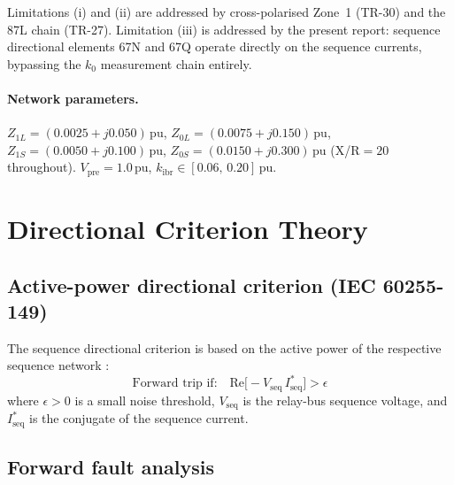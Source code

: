 \documentclass[11pt,a4paper]{article}
\begin{document}
Limitations (i) and (ii) are addressed by cross-polarised Zone~1 (TR-30) and the
87L chain (TR-27).  Limitation (iii) is addressed by the present report: sequence
directional elements 67N and 67Q operate directly on the sequence currents,
bypassing the $k_0$ measurement chain entirely.

\paragraph{Network parameters.}
$Z_{1L}=(0.0025+j0.050)$\,pu, $Z_{0L}=(0.0075+j0.150)$\,pu,
$Z_{1S}=(0.0050+j0.100)$\,pu, $Z_{0S}=(0.0150+j0.300)$\,pu (X/R$=20$
throughout).  $V_\mathrm{pre}=1.0$\,pu, $k_\mathrm{ibr} \in [0.06,\,0.20]$\,pu.

\section{Directional Criterion Theory}
\label{sec:theory}

\subsection{Active-power directional criterion (IEC 60255-149)}

The sequence directional criterion is based on the active power of the respective
sequence network \cite{IEC_60255_149}:
\begin{equation}
  \boxed{
    \text{Forward trip if:}\quad
    \mathrm{Re}\bigl[-V_\mathrm{seq}\,I_\mathrm{seq}^*\bigr] > \epsilon
  }
  \label{eq:dirn_crit}
\end{equation}
where $\epsilon > 0$ is a small noise threshold, $V_\mathrm{seq}$ is the
relay-bus sequence voltage, and $I_\mathrm{seq}^*$ is the conjugate of the
sequence current.

\subsection{Forward fault analysis}
\end{document}
